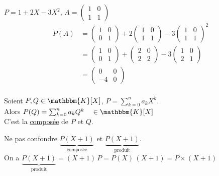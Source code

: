 \begin{exm}
	$P = 1+2X - 3X^2$, $A = \begin{pmatrix}
		1&0\\
		1&1
	\end{pmatrix}$ 
	\begin{align*}
		P(A) &= \begin{pmatrix}
			1&0\\
			0&1
		\end{pmatrix} + 2\begin{pmatrix}
			1&0\\
			1&1
		\end{pmatrix} - 3 \begin{pmatrix}
			1&0\\
			1&1
		\end{pmatrix}^2 \\
		&= \begin{pmatrix}
			1&0\\
			0&1
		\end{pmatrix} + \begin{pmatrix}
			2&0\\
			2&2
		\end{pmatrix} - 3 \begin{pmatrix}
			1&0\\
			2&1
		\end{pmatrix} \\
		&= \begin{pmatrix}
			0&0\\
			-4&0
		\end{pmatrix} \\
	\end{align*}
\end{exm}


\begin{defn}
	Soient $P,Q \in \mathbbm{K}[X]$, $P = \sum_{k=0}^n a_k X^k$.\\
	Alors $P(Q) = \sum_{k=0}^n a_k Q^k \quad \in \mathbbm{K}[X]$\\
	C'est la \underline{composée} de $P$ et $Q$.
\end{defn}

\begin{rmk}
	Ne pas confondre $\underbrace{P(X+1)}_{\text{composée}}$ et $\underbrace{P(X+1)}_{\text{produit}}$.\\
	On a $\underbrace{P(X+1)}_{\text{produit}} = (X+1)\,P = P(X)\,(X+1) = P \times (X+1)$
\end{rmk}

